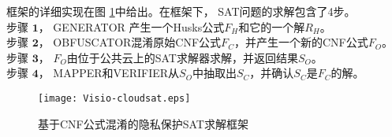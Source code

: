 框架的详细实现在图 \ref{fig_cldSAT}中给出。在框架下， SAT问题的求解包含了4步。\\
$\textbf{步骤 1}$， GENERATOR 产生一个Husks公式$F_H$和它的一个解$R_H$。\\
$\textbf{步骤 2}$， OBFUSCATOR混淆原始CNF公式$F_C$，并产生一个新的CNF公式$F_O$。\\
$\textbf{步骤 3}$， $F_O$由位于公共云上的SAT求解器求解，并返回结果$S_O$。\\
$\textbf{步骤 4}$， MAPPER和VERIFIER从$S_O$中抽取出$S_C$，并确认$S_C$是$F_C$的解。
\begin{figure}
\footnotesize\centering
\centerline{\texttt{[image: Visio-cloudsat.eps]}}
\caption{基于CNF公式混淆的隐私保护SAT求解框架}
\label{fig_cldSAT}
\end{figure}
%
%
%

